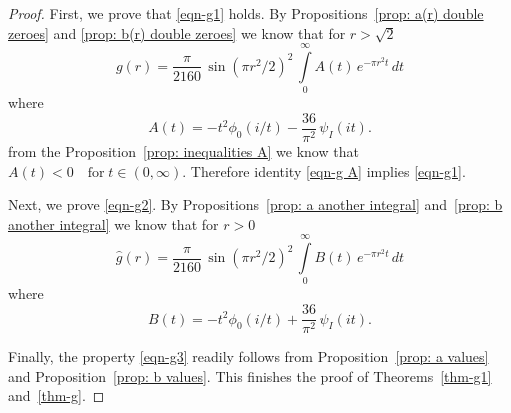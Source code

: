 \begin{proof}
First, we prove that \eqref{eqn-g1} holds. By Propositions~\ref{prop: a(r) double zeroes} and \ref{prop: b(r) double zeroes} we know that for $r>\sqrt{2}$
\begin{equation}\label{eqn-g A} g(r)=\frac{\pi}{2160}\,\sin(\pi r^2/2)^2\,\int\limits_0^\infty A(t)\,e^{-\pi r^2 t}\,dt\end{equation}
where $$A(t)=-t^2\phi_0(i/t)-\frac{36}{\pi^2}\,\psi_I(it).$$
from the Proposition~\ref{prop: inequalities A} we know that $A(t)<0\quad\mbox{for}\;t\in(0,\infty).$
Therefore identity \eqref{eqn-g A} implies \eqref{eqn-g1}.

Next, we prove \eqref{eqn-g2}. By Propositions~\ref{prop: a another integral} and~\ref{prop: b another integral} we know that for $r>0$
\begin{equation}\label{eqn-g B} \widehat{g}(r)=\frac{\pi}{2160}\,\sin(\pi r^2/2)^2\,\int\limits_0^\infty B(t)\,e^{-\pi r^2 t}\,dt\end{equation}
where $$B(t)=-t^2\phi_0(i/t)+\frac{36}{\pi^2}\,\psi_I(it).$$


Finally, the property \eqref{eqn-g3} readily follows from Proposition~\ref{prop: a values} and Proposition~\ref{prop: b values}.
This finishes the proof of Theorems~\ref{thm-g1} and~\ref{thm-g}.
\end{proof}
